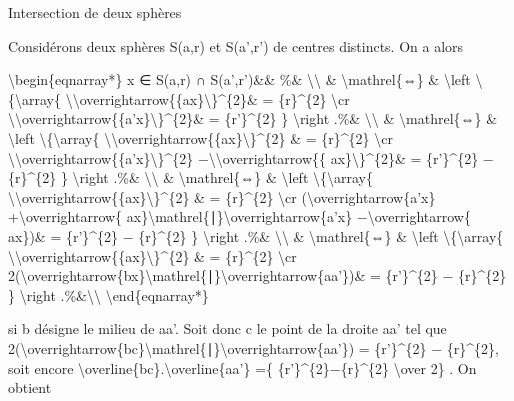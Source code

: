 \documentclass[]{article}
\begin{document}
Intersection de deux sphères

Considérons deux sphères S(a,r) et S(a',r') de centres distincts. On a
alors

\textbackslash{}begin\{eqnarray*\} x ∈ S(a,r) ∩ S(a',r')\&\& \%\&
\textbackslash{}\textbackslash{} \& \textbackslash{}mathrel\{⇔\} \&
\textbackslash{}left \textbackslash{}\{\textbackslash{}array\{
\textbackslash{}\textbar{}\textbackslash{}overrightarrow\{\{ax\}\textbackslash{}\textbar{}\}\^{}\{2\}\&
= \{r\}\^{}\{2\} \textbackslash{}cr
\textbackslash{}\textbar{}\textbackslash{}overrightarrow\{\{a'x\}\textbackslash{}\textbar{}\}\^{}\{2\}\&
= \{r'\}\^{}\{2\} \} \textbackslash{}right .\%\&
\textbackslash{}\textbackslash{} \& \textbackslash{}mathrel\{⇔\} \&
\textbackslash{}left \textbackslash{}\{\textbackslash{}array\{
\textbackslash{}\textbar{}\textbackslash{}overrightarrow\{\{ax\}\textbackslash{}\textbar{}\}\^{}\{2\}
\& = \{r\}\^{}\{2\} \textbackslash{}cr
\textbackslash{}\textbar{}\textbackslash{}overrightarrow\{\{a'x\}\textbackslash{}\textbar{}\}\^{}\{2\}
−\textbackslash{}\textbar{}\textbackslash{}overrightarrow\{\{
ax\}\textbackslash{}\textbar{}\}\^{}\{2\}\& = \{r'\}\^{}\{2\} −
\{r\}\^{}\{2\} \} \textbackslash{}right .\%\&
\textbackslash{}\textbackslash{} \& \textbackslash{}mathrel\{⇔\} \&
\textbackslash{}left \textbackslash{}\{\textbackslash{}array\{
\textbackslash{}\textbar{}\textbackslash{}overrightarrow\{\{ax\}\textbackslash{}\textbar{}\}\^{}\{2\}
\& = \{r\}\^{}\{2\} \textbackslash{}cr
(\textbackslash{}overrightarrow\{a'x\} +\textbackslash{}overrightarrow\{
ax\}\textbackslash{}mathrel\{∣\}\textbackslash{}overrightarrow\{a'x\}
−\textbackslash{}overrightarrow\{ ax\})\& = \{r'\}\^{}\{2\} −
\{r\}\^{}\{2\} \} \textbackslash{}right .\%\&
\textbackslash{}\textbackslash{} \& \textbackslash{}mathrel\{⇔\} \&
\textbackslash{}left \textbackslash{}\{\textbackslash{}array\{
\textbackslash{}\textbar{}\textbackslash{}overrightarrow\{\{ax\}\textbackslash{}\textbar{}\}\^{}\{2\}
\& = \{r\}\^{}\{2\} \textbackslash{}cr
2(\textbackslash{}overrightarrow\{bx\}\textbackslash{}mathrel\{∣\}\textbackslash{}overrightarrow\{aa'\})\&
= \{r'\}\^{}\{2\} − \{r\}\^{}\{2\} \} \textbackslash{}right
.\%\&\textbackslash{}\textbackslash{} \textbackslash{}end\{eqnarray*\}

si b désigne le milieu de aa'. Soit donc c le point de la droite aa' tel
que
2(\textbackslash{}overrightarrow\{bc\}\textbackslash{}mathrel\{∣\}\textbackslash{}overrightarrow\{aa'\})
= \{r'\}\^{}\{2\} − \{r\}\^{}\{2\}, soit encore
\textbackslash{}overline\{bc\}.\textbackslash{}overline\{aa'\} =\{
\{r'\}\^{}\{2\}−\{r\}\^{}\{2\} \textbackslash{}over 2\} . On obtient
\end{document}
